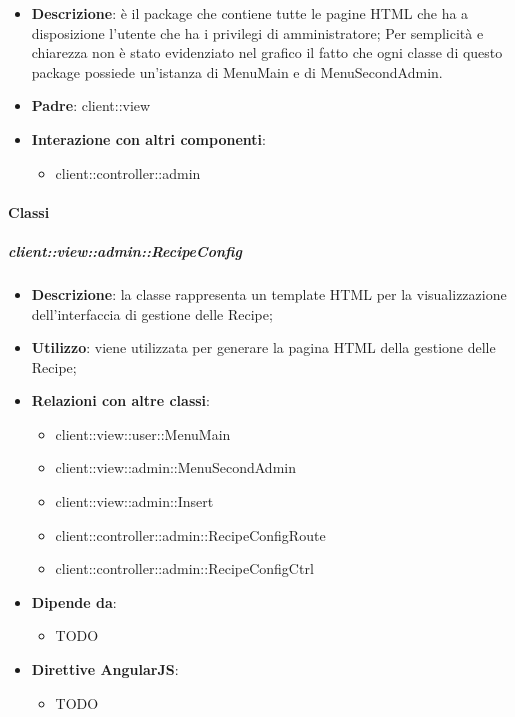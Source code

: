\begin{itemize}
	\item \textbf{Descrizione}: è il package che contiene tutte le pagine HTML che ha a disposizione l'utente che ha i privilegi di amministratore;\newline
	Per semplicità e chiarezza non è stato evidenziato nel grafico il fatto che ogni classe di questo package possiede un'istanza di MenuMain e di MenuSecondAdmin.
	\item \textbf{Padre}: client::view
	\item \textbf{Interazione con altri componenti}:
		\begin{itemize}
			\item client::controller::admin
		\end{itemize}
\end{itemize}

	\paragraph{Classi} %
		\subparagraph{client::view::admin::RecipeConfig} %
		\label{subp:bdsm_app_client_view_admin_recipeconfig}

			\begin{itemize}
				\item \textbf{Descrizione}: la classe rappresenta un template HTML per la visualizzazione dell'interfaccia di gestione delle Recipe;
				\item \textbf{Utilizzo}: viene utilizzata per generare la pagina HTML della gestione delle Recipe;
				\item \textbf{Relazioni con altre classi}:
					\begin{itemize}
						\item client::view::user::MenuMain
						\item client::view::admin::MenuSecondAdmin
						\item client::view::admin::Insert
						\item client::controller::admin::RecipeConfigRoute
						\item client::controller::admin::RecipeConfigCtrl
					\end{itemize}
				\item \textbf{Dipende da}:
					\begin{itemize}
						\item TODO
					\end{itemize}
				\item \textbf{Direttive AngularJS}:
					\begin{itemize}
						\item TODO
					\end{itemize}
			\end{itemize}

